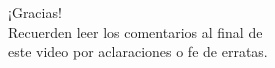 \documentclass[aspectratio=169]{beamer}
\begin{document}
\begin{frame}[plain]
    \begin{center}
    \vspace{2cm}
    \huge ¡Gracias!\\
    \vspace{2cm}
    \normalsize Recuerden leer los comentarios al final de \\ este video por aclaraciones o fe de erratas.
    \end{center}
\end{frame}
\end{document}

